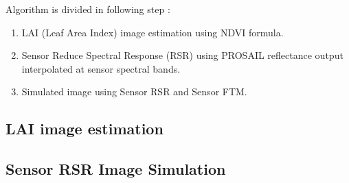 Algorithm is divided in following step :

\begin{enumerate}
\item LAI (Leaf Area Index) image estimation using NDVI formula.
\item Sensor Reduce Spectral Response (RSR) using PROSAIL reflectance output interpolated at sensor spectral bands.
\item Simulated image using Sensor RSR and Sensor FTM.
\end{enumerate}

\subsection{LAI image estimation}

\label{sec:LAIFromNDVI}


\subsection{Sensor RSR Image Simulation}

\label{sec:LAIAndPROSAILToSensorResponse}


\clearpage


